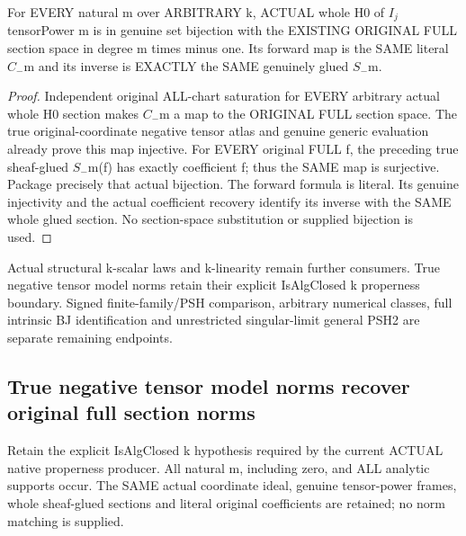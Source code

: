 \begin{theorem}
\label{thm:seven-native-negative-tensor-full-h0}
\leanok
For EVERY natural m over ARBITRARY k, ACTUAL whole H0 of $I_j$ tensorPower m
is in genuine set bijection with the EXISTING ORIGINAL FULL section
space in degree m times minus one. Its forward map is the SAME literal
$C_-$m and its inverse is EXACTLY the SAME genuinely glued $S_-$m.
\end{theorem}
\begin{proof}
Independent original ALL-chart saturation for EVERY arbitrary actual
whole H0 section makes $C_-$m a map to the ORIGINAL FULL section space.
The true original-coordinate negative tensor atlas and genuine generic
evaluation already prove this map injective. For EVERY original FULL
f, the preceding true sheaf-glued $S_-$m(f) has exactly coefficient f;
thus the SAME map is surjective. Package precisely that actual bijection.
The forward formula is literal. Its genuine injectivity and the actual
coefficient recovery identify its inverse with the SAME whole glued
section. No section-space substitution or supplied bijection is used.
\end{proof}

Actual structural k-scalar laws and k-linearity remain further consumers.
True negative tensor model norms retain their explicit IsAlgClosed k
properness boundary. Signed finite-family/PSH comparison, arbitrary
numerical classes, full intrinsic BJ identification and unrestricted
singular-limit general PSH2 are separate remaining endpoints.

\subsection{True negative tensor model norms recover original full section norms}
Retain the explicit IsAlgClosed k hypothesis required by the current
ACTUAL native properness producer. All natural m, including zero,
and ALL analytic supports occur. The SAME actual coordinate ideal,
genuine tensor-power frames, whole sheaf-glued sections and literal
original coefficients are retained; no norm matching is supplied.

